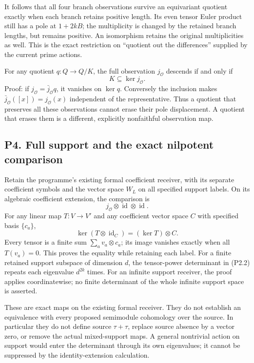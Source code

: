 It follows that all four branch observations survive an equivariant
quotient exactly when each branch retains positive length. Its even
tensor Euler product still has a pole at \(1+2kB\); the multiplicity is
changed by the retained branch lengths, but remains positive. An
isomorphism retains the original multiplicities as well. This is the
exact restriction on ``quotient out the differences'' supplied by the
current prime actions.

For any quotient \(q:Q\to Q/K\), the full observation \(j_{\mathcal O}\)
descends if and only if \[
K\subseteq\ker j_{\mathcal O}.
\tag{P3.3}
\] Proof: if \(j_{\mathcal O}=\bar j_{\mathcal O}q\), it vanishes on
\(\ker q\). Conversely the inclusion makes
\(\bar j_{\mathcal O}([x])=j_{\mathcal O}(x)\) independent of the
representative. Thus a quotient that preserves all these observations
cannot erase their pole displacement. A quotient that erases them is a
different, explicitly nonfaithful observation map.

\subsection{P4. Full support and the exact nilpotent
comparison}\label{p4.-full-support-and-the-exact-nilpotent-comparison}

Retain the programme's existing formal coefficient receiver, with its
separate coefficient symbols and the vector space \(W_L\) on all
specified support labels. On its algebraic coefficient extension, the
comparison is \[
j_{\mathcal O}\otimes\operatorname{id}\otimes\operatorname{id}.
\tag{P4.1}
\] For any linear map \(T:V\to V'\) and any coefficient vector space
\(C\) with specified basis \(\{c_a\}\), \[
\ker(T\otimes\operatorname{id}_C)
=(\ker T)\otimes C.
\tag{P4.2}
\] Every tensor is a finite sum \(\sum_a v_a\otimes c_a\); its image
vanishes exactly when all \(T(v_a)=0\). This proves the equality while
retaining each label. For a finite retained support subspace of
dimension \(d\), the tensor-power determinant in (P2.2) repeats each
eigenvalue \(d^{2k}\) times. For an infinite support receiver, the proof
applies coordinatewise; no finite determinant of the whole infinite
support space is asserted.

These are exact maps on the existing formal receiver. They do not
establish an equivalence with every proposed semimodule cohomology over
the source. In particular they do not define source \(\tau+\tau\),
replace source absence by a vector zero, or remove the actual
mixed-support maps. A general nontrivial action on support would enter
the determinant through its own eigenvalues; it cannot be suppressed by
the identity-extension calculation.

